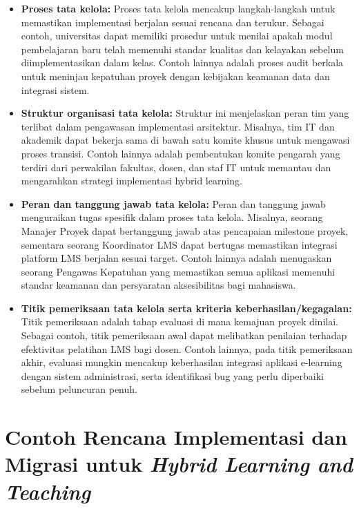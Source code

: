 \begin{itemize}
	\item \textbf{Proses tata kelola:} Proses tata kelola mencakup langkah-langkah untuk memastikan implementasi berjalan sesuai rencana dan terukur. Sebagai contoh, universitas dapat memiliki prosedur untuk menilai apakah modul pembelajaran baru telah memenuhi standar kualitas dan kelayakan sebelum diimplementasikan dalam kelas. Contoh lainnya adalah proses audit berkala untuk meninjau kepatuhan proyek dengan kebijakan keamanan data dan integrasi sistem.
	
	\item \textbf{Struktur organisasi tata kelola:} Struktur ini menjelaskan peran tim yang terlibat dalam pengawasan implementasi arsitektur. Misalnya, tim IT dan akademik dapat bekerja sama di bawah satu komite khusus untuk mengawasi proses transisi. Contoh lainnya adalah pembentukan komite pengarah yang terdiri dari perwakilan fakultas, dosen, dan staf IT untuk memantau dan mengarahkan strategi implementasi hybrid learning.
	
	\item \textbf{Peran dan tanggung jawab tata kelola:} Peran dan tanggung jawab menguraikan tugas spesifik dalam proses tata kelola. Misalnya, seorang Manajer Proyek dapat bertanggung jawab atas pencapaian milestone proyek, sementara seorang Koordinator LMS dapat bertugas memastikan integrasi platform LMS berjalan sesuai target. Contoh lainnya adalah menugaskan seorang Pengawas Kepatuhan yang memastikan semua aplikasi memenuhi standar keamanan dan persyaratan aksesibilitas bagi mahasiswa.
	
	\item \textbf{Titik pemeriksaan tata kelola serta kriteria keberhasilan/kegagalan:} Titik pemeriksaan adalah tahap evaluasi di mana kemajuan proyek dinilai. Sebagai contoh, titik pemeriksaan awal dapat melibatkan penilaian terhadap efektivitas pelatihan LMS bagi dosen. Contoh lainnya, pada titik pemeriksaan akhir, evaluasi mungkin mencakup keberhasilan integrasi aplikasi e-learning dengan sistem administrasi, serta identifikasi bug yang perlu diperbaiki sebelum peluncuran penuh.
\end{itemize}

\section{Contoh Rencana Implementasi dan Migrasi untuk \textit{Hybrid Learning and Teaching}}
\label{sec:contoh_rencana_implementasi_dan_migrasi}

